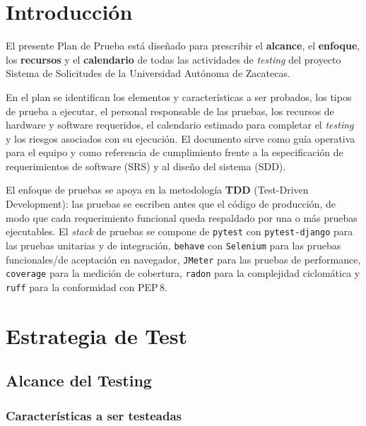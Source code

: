 \documentclass[12pt,letterpaper]{report}
\begin{document}
\chapter*{Introducción}

El presente Plan de Prueba está diseñado para prescribir el \textbf{alcance}, el
\textbf{enfoque}, los \textbf{recursos} y el \textbf{calendario} de todas las
actividades de \emph{testing} del proyecto Sistema de Solicitudes de la
Universidad Autónoma de Zacatecas.

En el plan se identifican los elementos y características a ser probados, los
tipos de prueba a ejecutar, el personal responsable de las pruebas, los recursos
de hardware y software requeridos, el calendario estimado para completar el
\emph{testing} y los riesgos asociados con su ejecución. El documento sirve como
guía operativa para el equipo y como referencia de cumplimiento frente a la
especificación de requerimientos de software (SRS) y al diseño del sistema
(SDD).

El enfoque de pruebas se apoya en la metodología \textbf{TDD} (Test-Driven
Development): las pruebas se escriben antes que el código de producción, de modo
que cada requerimiento funcional queda respaldado por una o más pruebas
ejecutables. El \emph{stack} de pruebas se compone de \texttt{pytest} con
\texttt{pytest-django} para las pruebas unitarias y de integración,
\texttt{behave} con \texttt{Selenium} para las pruebas funcionales/de aceptación
en navegador, \texttt{JMeter} para las pruebas de performance, \texttt{coverage}
para la medición de cobertura, \texttt{radon} para la complejidad ciclomática y
\texttt{ruff} para la conformidad con PEP\,8.

\chapter{Estrategia de Test}

\section{Alcance del Testing}

\subsection{Características a ser testeadas}
\end{document}

